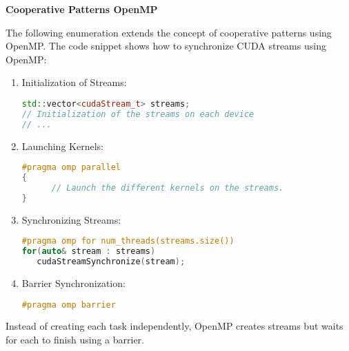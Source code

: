 \highspace
\begin{flushleft}
   \textcolor{Green3}{ \textbf{Cooperative Patterns OpenMP}}
\end{flushleft}
The following enumeration extends the concept of cooperative patterns using OpenMP. The code snippet shows how to synchronize CUDA streams using OpenMP:
\begin{enumerate}
   \item Initialization of Streams:
   \begin{lstlisting}[language=C++]
std::vector<cudaStream_t> streams;
// Initialization of the streams on each device
// ...\end{lstlisting}

   \item Launching Kernels:
   \begin{lstlisting}[language=C++]
#pragma omp parallel
{
      // Launch the different kernels on the streams.
}\end{lstlisting}

   \item Synchronizing Streams:
   \begin{lstlisting}[language=C++]
#pragma omp for num_threads(streams.size())
for(auto& stream : streams)
   cudaStreamSynchronize(stream);\end{lstlisting}

   \item Barrier Synchronization:
   \begin{lstlisting}[language=C++]
#pragma omp barrier\end{lstlisting}
\end{enumerate}
Instead of creating each task independently, OpenMP creates streams but waits for each to finish using a barrier.
